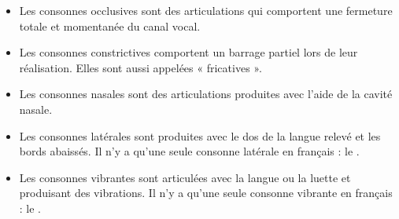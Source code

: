 \begin{itemize}
\item Les consonnes occlusives sont des articulations qui comportent une fermeture totale et momentanée du canal vocal.
\item Les consonnes constrictives comportent un barrage partiel lors de leur réalisation. Elles sont aussi appelées « fricatives ».
\item Les consonnes nasales sont des articulations produites avec l’aide de la cavité nasale.
\item Les consonnes latérales sont produites avec le dos de la langue relevé et les bords abaissés. Il n’y a qu’une seule consonne latérale en français : le .
\item Les consonnes vibrantes sont articulées avec la langue ou la luette et produisant des vibrations.
Il n’y a qu’une seule consonne vibrante en français : le \bipa{[ʁ]}.
\end{itemize}
